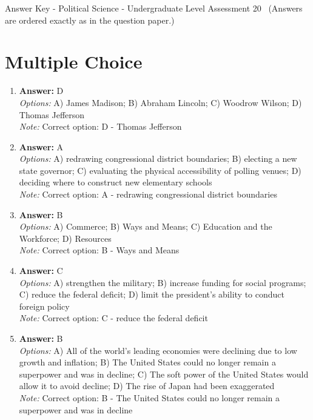 \documentclass[12pt]{article}
\begin{document}
\begin{center}
Answer Key - Political Science - Undergraduate Level Assessment 20 \
\small (Answers are ordered exactly as in the question paper.)
\end{center}

\section*{Multiple Choice}
\begin{enumerate}[label=\arabic*.]
\item \textbf{Answer:} D
\\ \textit{Options:} A) James Madison; B) Abraham Lincoln; C) Woodrow Wilson; D) Thomas Jefferson
\\ \textit{Note:} Correct option: D - Thomas Jefferson
\item \textbf{Answer:} A
\\ \textit{Options:} A) redrawing congressional district boundaries; B) electing a new state governor; C) evaluating the physical accessibility of polling venues; D) deciding where to construct new elementary schools
\\ \textit{Note:} Correct option: A - redrawing congressional district boundaries
\item \textbf{Answer:} B
\\ \textit{Options:} A) Commerce; B) Ways and Means; C) Education and the Workforce; D) Resources
\\ \textit{Note:} Correct option: B - Ways and Means
\item \textbf{Answer:} C
\\ \textit{Options:} A) strengthen the military; B) increase funding for social programs; C) reduce the federal deficit; D) limit the president's ability to conduct foreign policy
\\ \textit{Note:} Correct option: C - reduce the federal deficit
\item \textbf{Answer:} B
\\ \textit{Options:} A) All of the world's leading economies were declining due to low growth and inflation; B) The United States could no longer remain a superpower and was in decline; C) The soft power of the United States would allow it to avoid decline; D) The rise of Japan had been exaggerated
\\ \textit{Note:} Correct option: B - The United States could no longer remain a superpower and was in decline
\end{enumerate}
\end{document}
